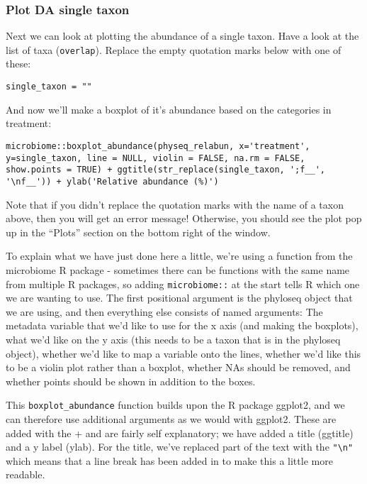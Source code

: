 \documentclass[
]{book}
\begin{document}
\subsubsection{Plot DA single taxon}\label{plot-da-single-taxon}

Next we can look at plotting the abundance of a single taxon. Have a look at the list of taxa (\texttt{overlap}). Replace the empty quotation marks below with one of these:

\begin{verbatim}
single_taxon = ""
\end{verbatim}

And now we'll make a boxplot of it's abundance based on the categories in treatment:

\begin{verbatim}
microbiome::boxplot_abundance(physeq_relabun, x='treatment', y=single_taxon, line = NULL, violin = FALSE, na.rm = FALSE, show.points = TRUE) + ggtitle(str_replace(single_taxon, ';f__', '\nf__')) + ylab('Relative abundance (%)')
\end{verbatim}

Note that if you didn't replace the quotation marks with the name of a taxon above, then you will get an error message! Otherwise, you should see the plot pop up in the ``Plots'' section on the bottom right of the window.

To explain what we have just done here a little, we're using a function from the microbiome R package - sometimes there can be functions with the same name from multiple R packages, so adding \texttt{microbiome::} at the start tells R which one we are wanting to use. The first positional argument is the phyloseq object that we are using, and then everything else consists of named arguments: The metadata variable that we'd like to use for the x axis (and making the boxplots), what we'd like on the y axis (this needs to be a taxon that is in the phyloseq object), whether we'd like to map a variable onto the lines, whether we'd like this to be a violin plot rather than a boxplot, whether NAs should be removed, and whether points should be shown in addition to the boxes.

This \texttt{boxplot\_abundance} function builds upon the R package ggplot2, and we can therefore use additional arguments as we would with ggplot2. These are added with the + and are fairly self explanatory; we have added a title (ggtitle) and a y label (ylab). For the title, we've replaced part of the text with the \texttt{"\textbackslash{}n"} which means that a line break has been added in to make this a little more readable.
\end{document}
